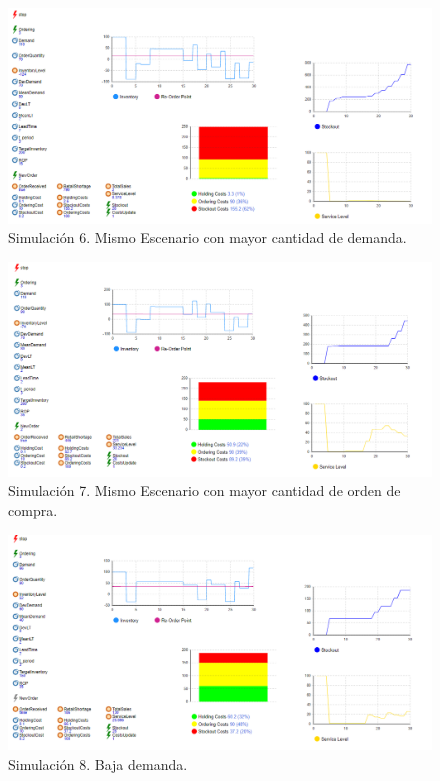     \begin{figure}[H]
        \includegraphics[width=\linewidth]{images/img6invent}
        \caption{Simulación 6. Mismo Escenario con mayor cantidad de demanda.}
    \end{figure}

    \begin{figure}[H]
        \includegraphics[width=\linewidth]{images/img7invent}
        \caption{Simulación 7. Mismo Escenario con mayor cantidad de orden de compra.}
    \end{figure}

    \begin{figure}[H]
        \includegraphics[width=\linewidth]{images/img8invent}
        \caption{Simulación 8. Baja demanda.}
    \end{figure}

